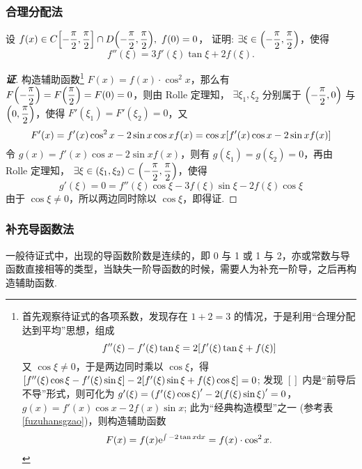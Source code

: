 \subsubsection{合理分配法}

\begin{example}
    设 $f(x)\in C\qty[-\dfrac{\pi}{2},\dfrac{\pi}{2}]\cap D\qty(-\dfrac{\pi}{2},\dfrac{\pi}{2}),~f(0)=0$，
    证明: $\exists\xi\in\qty(-\dfrac{\pi}{2},\dfrac{\pi}{2})$，使得 $$f''(\xi)=3f'(\xi)\tan\xi+2f(\xi).$$
\end{example}
\begin{proof}[{\songti \textbf{证}}]
    构造辅助函数\footnote{
        首先观察待证式的各项系数，发现存在 $1+2=3$ 的情况，于是利用“合理分配达到平均”思想，组成 $$f''(\xi)-f'(\xi)\tan\xi=2\qty[f'(\xi)\tan\xi+f(\xi)]$$
        又 $\cos\xi\neq0$，于是两边同时乘以 $\cos\xi$，得 $\qty[f''(\xi)\cos\xi-f'(\xi)\sin\xi]-2\qty[f'(\xi)\sin\xi+f(\xi)\cos\xi]=0$;
        发现 $[]$ 内是“前导后不导”形式，则可化为 $g'(\xi)=\qty(f'(\xi)\cos\xi)'-2\qty(f(\xi)\sin\xi)'=0$，$g(x)=f'(x)\cos x-2f(x)\sin x$;
        此为“经典构造模型”之一 (参考表 \ref{fuzuhansgzao})，则构造辅助函数 $$F(x)=f(x)\mathrm{e}^{\int-2\tan x\dd x}=f(x)\cdot\cos^2x.$$
    } $F(x)=f(x)\cdot\cos^2x$，那么有 $F\qty(-\dfrac{\pi}{2})=F\qty(\dfrac{\pi}{2})=F(0)=0$，则由 Rolle 定理知，
    $\exists\xi_1,\xi_2$ 分别属于 $\qty(-\dfrac{\pi}{2},0)$ 与 $\qty(0,\dfrac{\pi}{2})$，使得 $F'(\xi_1)=F'(\xi_2)=0$，又
    $$F'(x)=f'(x)\cos^2x-2\sin x\cos xf(x)=\cos x\qty[f'(x)\cos x-2\sin xf(x)]$$
    令 $g(x)=f'(x)\cos x-2\sin xf(x)$，则有 $g(\xi_1)=g(\xi_2)=0$，再由 Rolle 定理知，
    $\exists\xi\in(\xi_1,\xi_2)\subset\qty(-\dfrac{\pi}{2},\dfrac{\pi}{2})$，使得
    $$g'(\xi)=0=f''(\xi)\cos \xi-3f(\xi)\sin\xi-2f(\xi)\cos\xi$$
    由于 $\cos\xi\neq0$，所以两边同时除以 $\cos\xi$，即得证.
\end{proof}

\subsubsection{补充导函数法}

一般待证式中，出现的导函数阶数是连续的，即 0 与 1 或 1 与 2，亦或常数与导函数直接相等的类型，当缺失一阶导函数的时候，需要人为补充一阶导，之后再构造辅助函数.

